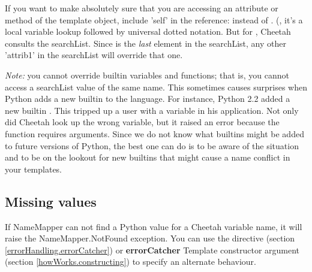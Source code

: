 If you want to make absolutely sure that you are accessing an attribute or
method of the template object, include 'self' in the reference:
 instead of .  (, it's
a local variable lookup followed by universal dotted notation.  But for
, Cheetah consults the searchList.  Since  is the
{\em last} element in the searchList, any other 'attrib1' in the searchList
will override that one.

{\em Note:} you cannot override builtin variables and functions; that is, you
cannot access a searchList value of the same name.  This sometimes causes
surprises when Python adds a new builtin to the language.  For instance, Python
2.2 added a new builtin .  This tripped up a user with a 
 variable in his application.  Not only did Cheetah look up
the wrong variable, but it raised an error because the  function
requires arguments.  Since we do not know what builtins might be added to future
versions of Python, the best one can do is to be aware of the situation and to
be on the lookout for new builtins that might cause a name conflict in your
templates.

\subsection{Missing values}
\label{language.namemapper.missing}

If NameMapper can not find a Python value for a Cheetah variable name, it will
raise the NameMapper.NotFound exception.  You can use the 
directive (section \ref{errorHandling.errorCatcher}) or {\bf errorCatcher}
Template constructor argument (section \ref{howWorks.constructing}) to specify
an alternate behaviour.



